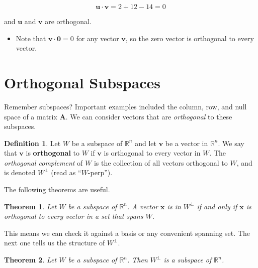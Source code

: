 \documentclass[
]{book}
\providecommand{\tightlist}{%
  \setlength{\itemsep}{0pt}\setlength{\parskip}{0pt}}
\newtheorem{theorem}{Theorem}[chapter]
\theoremstyle{definition}
\newtheorem{definition}{Definition}[chapter]
\theoremstyle{definition}
\theoremstyle{definition}
\theoremstyle{definition}
\theoremstyle{remark}
\begin{document}
\[\mathbf{u}\cdot \mathbf{v}=2+12-14=0\]

and \(\mathbf{u}\) and \(\mathbf{v}\) are orthogonal.

\begin{itemize}
\tightlist
\item
  Note that \(\mathbf{v}\cdot\mathbf{0}=0\) for any vector \(\mathbf{v}\), so the zero vector is orthogonal to every vector.
\end{itemize}

\section{Orthogonal Subspaces}\label{orthogonal-subspaces}

Remember subspaces? Important examples included the column, row, and null space of a matrix \(\mathbf{A}\). We can consider vectors that are \emph{orthogonal} to these subspaces.

\begin{defbox}

\begin{definition}
Let \(W\) be a subspace of \(\mathbb{R}^n\) and let \(\mathbf{v}\) be a vector in \(\mathbb{R}^n\). We say that \(\mathbf{v}\) is \textbf{orthogonal} to \(W\) if
\(\mathbf{v}\) is orthogonal to every vector in \(W\). The \emph{orthogonal complement} of \(W\) is the collection of all vectors orthogonal to \(W\), and is denoted \(W^{\perp}\) (read as ``\(W\)-perp'').
\end{definition}

\end{defbox}

The following theorems are useful.

\begin{theorembox}

\begin{theorem}
Let \(W\) be a subspace of \(\mathbb{R}^n\). A vector \(\mathbf{x}\) is in \(W^\perp\) if and only if \(\mathbf{x}\) is orthogonal to every vector in a set that spans \(W\).
\end{theorem}

\end{theorembox}

This means we can check it against a basis or any convenient spanning set. The next one tells us the structure of \(W^{\perp}.\)

\begin{theorembox}

\begin{theorem}
Let \(W\) be a subspace of \(\mathbb{R}^n\). Then \(W^\perp\) is a subspace of \(\mathbb{R}^n\).
\end{theorem}

\end{theorembox}
\end{document}
